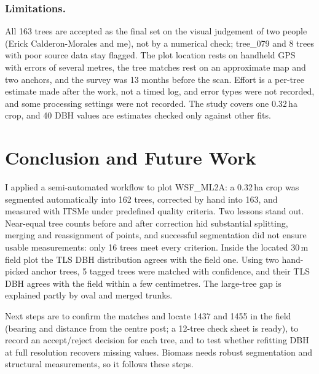 \documentclass[runningheads]{llncs}
\begin{document}
\subsubsection{Limitations.}
All 163 trees are accepted as the final set on the visual judgement of two people (Erick Calderon-Morales and me), not by a numerical check; tree\_079 and 8 trees with poor source data stay flagged. The plot location rests on handheld GPS with errors of several metres, the tree matches rest on an approximate map and two anchors, and the survey was 13 months before the scan. Effort is a per-tree estimate made after the work, not a timed log, and error types were not recorded, and some processing settings were not recorded. The study covers one 0.32\,ha crop, and 40 DBH values are estimates checked only against other fits.

\section{Conclusion and Future Work}\label{sec:conclusion}
I applied a semi-automated workflow to plot WSF\_ML2A: a 0.32\,ha crop was segmented automatically into 162 trees, corrected by hand into 163, and measured with ITSMe under predefined quality criteria. Two lessons stand out. Near-equal tree counts before and after correction hid substantial splitting, merging and reassignment of points, and successful segmentation did not ensure usable measurements: only 16 trees meet every criterion. Inside the located 30\,m field plot the TLS DBH distribution agrees with the field one. Using two hand-picked anchor trees, 5 tagged trees were matched with confidence, and their TLS DBH agrees with the field within a few centimetres. The large-tree gap is explained partly by oval and merged trunks.

Next steps are to confirm the matches and locate 1437 and 1455 in the field (bearing and distance from the centre post; a 12-tree check sheet is ready), to record an accept/reject decision for each tree, and to test whether refitting DBH at full resolution recovers missing values. Biomass needs robust segmentation and structural measurements, so it follows these steps.
\end{document}
